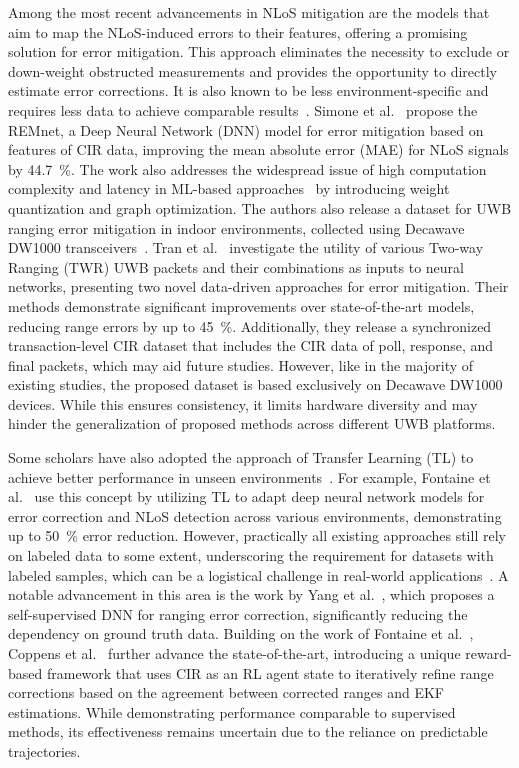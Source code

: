 Among the most recent advancements in NLoS mitigation are the models that aim to map the NLoS-induced errors to their features, offering a promising solution for error mitigation. This approach eliminates the necessity to exclude or down-weight obstructed measurements and provides the opportunity to directly estimate error corrections. It is also known to be less environment-specific and requires less data to achieve comparable results~\cite{savic2015kernel, Simone2021UWB, Kim2023NLOS}. Simone et al.~\cite{Simone2021UWB} propose the REMnet, a Deep Neural Network (DNN) model for error mitigation based on features of CIR data, improving the mean absolute error (MAE) for NLoS signals by \SI{44.7}{\percent}. The work also addresses the widespread issue of high computation complexity and latency in ML-based approaches~\cite{Zeng2018NLOS} by introducing weight quantization and graph optimization. The authors also release a dataset for UWB ranging error mitigation in indoor environments, collected using Decawave DW1000 transceivers~\cite{simone_angarano_2020_4399187}. Tran et al.~\cite{Tran2022UWB} investigate the utility of various Two-way Ranging (TWR) UWB packets and their combinations as inputs to neural networks, presenting two novel data-driven approaches for error mitigation. Their methods demonstrate significant improvements over state-of-the-art models, reducing range errors by up to \SI{45}{\percent}. Additionally, they release a synchronized transaction-level CIR dataset that includes the CIR data of poll, response, and final packets, which may aid future studies. However, like in the majority of existing studies, the proposed dataset is based exclusively on Decawave DW1000 devices. While this ensures consistency, it limits hardware diversity and may hinder the generalization of proposed methods across different UWB platforms.

Some scholars have also adopted the approach of Transfer Learning (TL) to achieve better performance in unseen environments~\cite{fontaine2023transfer, li2023unsupervised}. For example, Fontaine et al.~\cite{fontaine2023transfer} use this concept by utilizing TL to adapt deep neural network models for error correction and NLoS detection across various environments, demonstrating up to \SI{50}{\percent} error reduction. However, practically all existing approaches still rely on labeled data to some extent, underscoring the requirement for datasets with labeled samples, which can be a logistical challenge in real-world applications~\cite{coppens2024removing}. A notable advancement in this area is the work by Yang et al.~\cite{yang2023self}, which proposes a self-supervised DNN for ranging error correction, significantly reducing the dependency on ground truth data. Building on the work of Fontaine et al.~\cite{fontaine2023transfer}, Coppens et al.~\cite{coppens2024removing} further advance the state-of-the-art, introducing a unique reward-based framework that uses CIR as an RL agent state to iteratively refine range corrections based on the agreement between corrected ranges and EKF estimations. While demonstrating performance comparable to supervised methods, its effectiveness remains uncertain due to the reliance on predictable trajectories.


